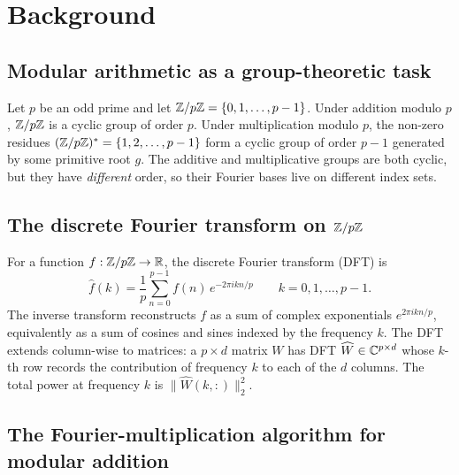 \section{Background}
\label{sec:background}

\subsection{Modular arithmetic as a group-theoretic task}

Let $p$ be an odd prime and let $\mathbb{Z}/p\mathbb{Z} = \{0, 1, \ldots, p-1\}$.
Under addition modulo $p$, $\mathbb{Z}/p\mathbb{Z}$ is a cyclic group of order $p$.
Under multiplication modulo $p$, the non-zero residues
$(\mathbb{Z}/p\mathbb{Z})^* = \{1, 2, \ldots, p-1\}$ form a cyclic group of order $p - 1$
generated by some primitive root $g$. The additive and multiplicative
groups are both cyclic, but they have \emph{different} order, so their
Fourier bases live on different index sets.

\subsection{The discrete Fourier transform on $\mathbb{Z}/p\mathbb{Z}$}

For a function $f : \mathbb{Z}/p\mathbb{Z} \to \mathbb{R}$, the discrete Fourier transform (DFT) is
\begin{equation}
\hat f(k)
= \frac{1}{p} \sum_{n = 0}^{p - 1} f(n) \, e^{-2 \pi i k n / p}
\qquad k = 0, 1, \ldots, p - 1.
\label{eq:dft}
\end{equation}
The inverse transform reconstructs $f$ as a sum of complex exponentials
$e^{2\pi i k n / p}$, equivalently as a sum of cosines and sines indexed by
the frequency $k$. The DFT extends column-wise to matrices: a
$p \times d$ matrix $W$ has DFT $\widehat W \in \mathbb{C}^{p \times d}$ whose
$k$-th row records the contribution of frequency $k$ to each of the $d$
columns. The total power at frequency $k$ is
$\| \widehat W(k, :) \|_2^2$.

\subsection{The Fourier-multiplication algorithm for modular addition}

